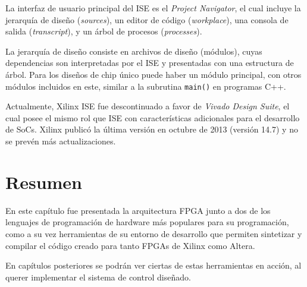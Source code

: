 La interfaz de usuario principal del ISE es el \emph{Project Navigator}, el cual incluye la jerarquía de diseño (\emph{sources}), un editor de código (\emph{workplace}), una consola de salida (\emph{transcript}), y un árbol de procesos (\emph{processes}).

La jerarquía de diseño consiste en archivos de diseño (módulos), cuyas dependencias son interpretadas por el ISE y presentadas con una estructura de árbol. Para los diseños de chip único puede haber un módulo principal, con otros módulos incluidos en este, similar a la subrutina \texttt{main()} en programas C++.

Actualmente, Xilinx ISE fue descontinuado a favor de \emph{Vivado Design Suite}, el cual posee el mismo rol que ISE con características adicionales para el desarrollo de SoCs. Xilinx publicó la última versión en octubre de 2013 (versión 14.7) y no se prevén más actualizaciones. 


\section{Resumen}

En este capítulo fue presentada la arquitectura FPGA junto a dos de los lenguajes de programación de hardware más populares para su programación, como a su vez herramientas de su entorno de desarrollo que permiten sintetizar y compilar el código creado para tanto FPGAs de Xilinx como Altera.

En capítulos posteriores se podrán ver ciertas de estas herramientas en acción, al querer implementar el sistema de control diseñado.